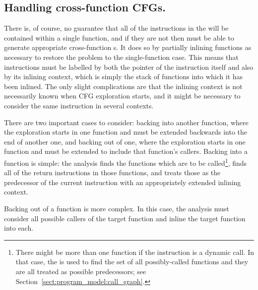 \subsection{Handling cross-function CFGs.}

\label{sect:derive:cross_function_cfgs}


There is, of course, no guarantee that all of the instructions in the
 will be contained within a single function,
and if they are not then {\technique} must be able to generate
appropriate cross-function s.  It does so by partially
inlining functions as necessary to restore the problem to the
single-function case.  This means that instructions must be labelled
by both the pointer of the instruction itself and also by its inlining
context, which is simply the stack of functions into which it has been
inlined.  The only slight complications
are that the inlining context is not necessarily known when CFG
exploration starts, and it might be necessary to consider the same
instruction in several contexts.


There are two important cases to consider: backing into another
function, where the exploration starts in one function and must be
extended backwards into the end of another one, and backing out of
one, where the exploration starts in one function and must be extended
to include that function's callers.  Backing into a function is
simple: the analysis finds the functions which are to be
called\footnote{There might be more than one function if the
  instruction is a dynamic call.  In that case, the  is used to find the set of all possibly-called functions
  and they are all treated as possible predecessors; see
  Section~\ref{sect:program_model:call_graph}.}, finds all of the
return instructions in those functions, and treats those as the
predecessor of the current instruction with an appropriately extended
inlining context.

Backing out of a function is more complex.  In this case, the analysis
must consider all possible callers of the target function and inline
the target function into each.  

